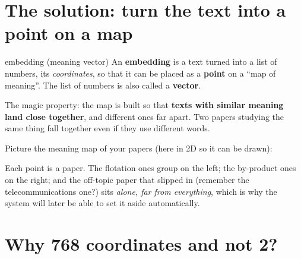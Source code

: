 \documentclass[11pt,a4paper]{article}
\begin{document}
\section{The solution: turn the text into a point on a map}

\begin{concepto}{embedding (meaning vector)}
An \textbf{embedding} is a text turned into a list of numbers, its \emph{coordinates}, so
that it can be placed as a \textbf{point} on a ``map of meaning''. The list of numbers is
also called a \textbf{vector}.

The magic property: the map is built so that \textbf{texts with similar meaning land close
together}, and different ones far apart. Two papers studying the same thing fall together
even if they use different words.
\end{concepto}

Picture the meaning map of your papers (here in 2D so it can be drawn):

\begin{center}
\end{center}

Each point is a paper. The flotation ones group on the left; the by-product ones on the
right; and the off-topic paper that slipped in (remember the telecommunications one?) sits
\emph{alone, far from everything}, which is why the system will later be able to set it aside
automatically.

\section{Why 768 coordinates and not 2?}
\end{document}

